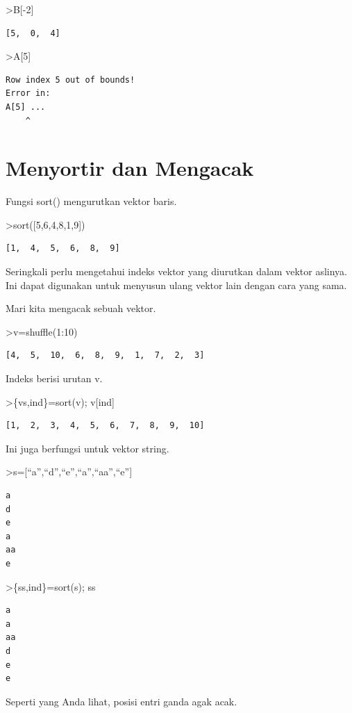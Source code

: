 \documentclass[
]{book}
\begin{document}
\textgreater B{[}-2{]}

\begin{verbatim}
[5,  0,  4]
\end{verbatim}

\textgreater A{[}5{]}

\begin{verbatim}
Row index 5 out of bounds!
Error in:
A[5] ...
    ^
\end{verbatim}

\chapter{Menyortir dan Mengacak}\label{menyortir-dan-mengacak}

Fungsi sort() mengurutkan vektor baris.

\textgreater sort({[}5,6,4,8,1,9{]})

\begin{verbatim}
[1,  4,  5,  6,  8,  9]
\end{verbatim}

Seringkali perlu mengetahui indeks vektor yang diurutkan dalam vektor aslinya. Ini dapat digunakan untuk menyusun ulang vektor lain dengan cara yang sama.

Mari kita mengacak sebuah vektor.

\textgreater v=shuffle(1:10)

\begin{verbatim}
[4,  5,  10,  6,  8,  9,  1,  7,  2,  3]
\end{verbatim}

Indeks berisi urutan v.

\textgreater\{vs,ind\}=sort(v); v{[}ind{]}

\begin{verbatim}
[1,  2,  3,  4,  5,  6,  7,  8,  9,  10]
\end{verbatim}

Ini juga berfungsi untuk vektor string.

\textgreater s={[}``a'',``d'',``e'',``a'',``aa'',``e''{]}

\begin{verbatim}
a
d
e
a
aa
e
\end{verbatim}

\textgreater\{ss,ind\}=sort(s); ss

\begin{verbatim}
a
a
aa
d
e
e
\end{verbatim}

Seperti yang Anda lihat, posisi entri ganda agak acak.
\end{document}
